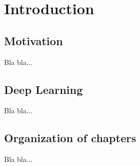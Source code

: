 
\chapter{Introduction}\label{chapter:introduction}

\section{Motivation}

Bla bla...

\section{Deep Learning}

Bla bla...

\section{Organization of chapters}

Bla bla...


